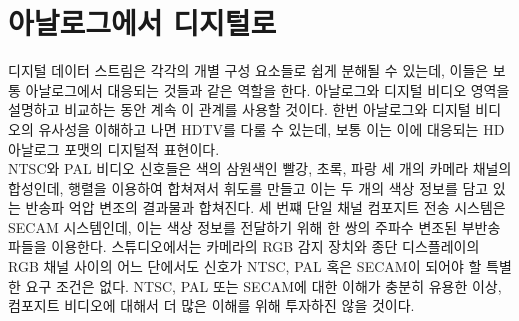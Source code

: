 \chapter{아날로그에서 디지털로}
디지털 데이터 스트림은 각각의 개별 구성 요소들로 쉽게 분해될 수 있는데, 이들은 보통 아날로그에서 대응되는 것들과 같은 역할을 한다.
아날로그와 디지털 비디오 영역을 설명하고 비교하는 동안 계속 이 관계를 사용할 것이다.
한번 아날로그와 디지털 비디오의 유사성을 이해하고 나면 HDTV를 다룰 수 있는데, 보통 이는 이에 대응되는 HD 아날로그 포맷의 디지털적 표현이다.
\\
NTSC와 PAL 비디오 신호들은 색의 삼원색인 빨강, 초록, 파랑 세 개의 카메라 채널의 합성인데, 행렬을 이용하여 합쳐져서 휘도를 만들고 이는 두 개의 색상 정보를 담고 있는 반송파 억압 변조의 결과물과 합쳐진다.
세 번쨰 단일 채널 컴포지트 전송 시스템은 SECAM 시스템인데, 이는 색상 정보를 전달하기 위해 한 쌍의 주파수 변조된 부반송파들을 이용한다.
스튜디오에서는 카메라의 RGB 감지 장치와 종단 디스플레이의 RGB 채널 사이의 어느 단에서도 신호가 NTSC, PAL 혹은 SECAM이 되어야 할 특별한 요구 조건은 없다.
NTSC, PAL 또는 SECAM에 대한 이해가 충분히 유용한 이상, 컴포지트 비디오에 대해서 더 많은 이해를 위해 투자하진 않을 것이다.

